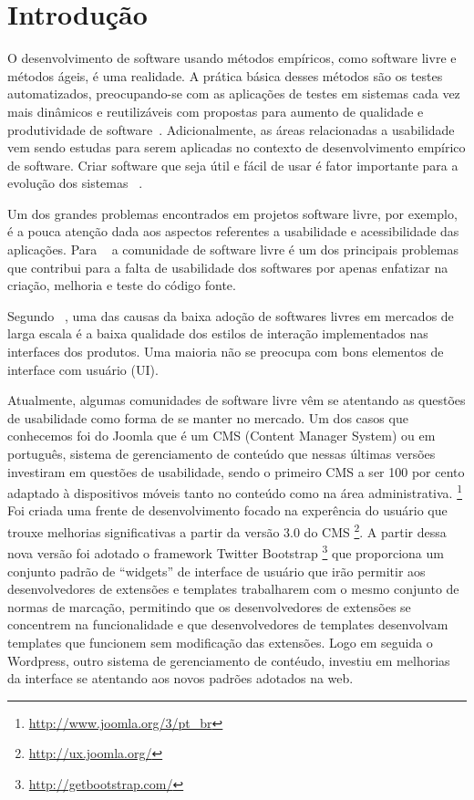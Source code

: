 \chapter{Introdução}

O desenvolvimento de software usando métodos empíricos, como software livre e métodos ágeis, é uma realidade. A prática básica desses métodos são os testes automatizados, preocupando-se com as aplicações de testes em sistemas cada vez mais dinâmicos e reutilizáveis com propostas para aumento de qualidade e produtividade de software~\cite{vicente2010}.
%
Adicionalmente, as áreas relacionadas a usabilidade vem sendo estudas para serem aplicadas no contexto de desenvolvimento empírico de software. Criar software que seja útil e fácil de usar é fator importante para a evolução dos sistemas ~\cite{santos2012}.

Um dos grandes problemas encontrados em projetos software livre, por exemplo, é a pouca atenção dada aos aspectos referentes a usabilidade e acessibilidade das aplicações. Para ~ a comunidade de software livre é um dos principais problemas que contribui para a falta de usabilidade dos softwares por apenas enfatizar na criação, melhoria e teste do código fonte.

%
Segundo ~, uma das causas da baixa adoção de softwares livres em mercados de larga escala é a baixa qualidade dos estilos de interação implementados nas interfaces dos produtos. Uma maioria não se preocupa com bons elementos de interface com usuário (UI). 

Atualmente, algumas comunidades de software livre vêm se atentando as questões de usabilidade como forma de se manter no mercado. Um dos casos que conhecemos foi do Joomla que é um CMS (Content Manager System) ou em português, sistema de gerenciamento de conteúdo que nessas últimas versões investiram em questões de usabilidade, sendo o primeiro CMS a ser 100 por cento adaptado à dispositivos móveis tanto no conteúdo como na área administrativa. \footnote{\url{http://www.joomla.org/3/pt_br}}
Foi criada uma frente de desenvolvimento focado na experência do usuário que trouxe melhorias significativas a partir da versão 3.0 do CMS \footnote{\url{http://ux.joomla.org/}}. A partir dessa nova versão foi adotado o framework Twitter Bootstrap \footnote{\url{http://getbootstrap.com/}} que proporciona um conjunto padrão de “widgets” de interface de usuário que irão permitir aos desenvolvedores de extensões e templates  trabalharem com o mesmo conjunto de normas de marcação, permitindo que os desenvolvedores de extensões se concentrem na funcionalidade e que desenvolvedores de templates desenvolvam templates que funcionem sem modificação das extensões. 
Logo em seguida o Wordpress, outro sistema de gerenciamento de contéudo, investiu em melhorias da interface se atentando aos novos padrões adotados na web.

